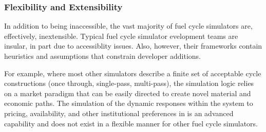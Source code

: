 \subsubsection{Flexibility and Extensibility}

In addition to being inaccessible, the vast majority of fuel cycle simulators
are, effectively, inextensible. Typical fuel cycle simulator evelopment teams are insular, in
part due to accessiblity issues. Also, however, their frameworks contain
heuristics and assumptions that constrain developer additions.

For example, where most other simulators describe a finite set of acceptable
cycle constructions (once through, single-pass, multi-pass), the \Cyclus
simulation logic relies on a market paradigm that can be easily directed to
create novel material and economic paths. The simulation of the dynamic
responses within the system to pricing, availability, and other institutional
preferences in \Cyclus is an advanced capability and does not exist in a
flexible manner for other fuel cycle simulators.

